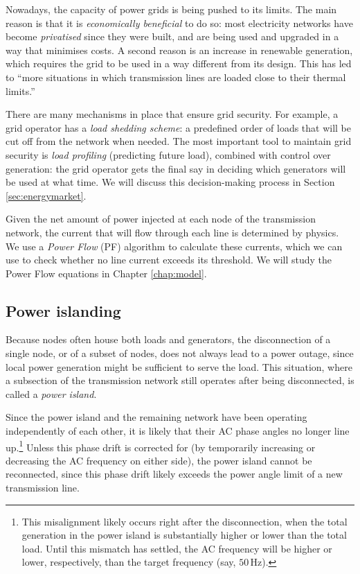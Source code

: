 \documentclass[main.tex]{subfiles}
\begin{document}
Nowadays, the capacity of power grids is being pushed to its limits. The main reason is that it is \emph{economically beneficial} to do so: most electricity networks have become \emph{privatised} since they were built, and are being used and upgraded in a way that minimises costs. A second reason is an increase in renewable generation, which requires the grid to be used in a way different from its design. This has led to ``more situations in which transmission lines are loaded close to their thermal limits.'' \citep{Ronellenfitsch2017}

There are many mechanisms in place that ensure grid security. For example, a grid operator has a \emph{load shedding scheme}: a predefined order of loads that will be cut off from the network when needed. The most important tool to maintain grid security is \emph{load profiling} (\ie predicting future load), combined with control over generation: the grid operator gets the final say in deciding which generators will be used at what time. We will discuss this decision-making process in Section \ref{sec:energymarket}.

Given the net amount of power injected at each node of the transmission network, the current that will flow through each line is determined by physics. We use a \emph{Power Flow} (PF) algorithm to calculate these currents, which we can use to check whether no line current exceeds its threshold. We will study the Power Flow equations in Chapter \ref{chap:model}.

\subsection{Power islanding}
Because nodes often house both loads and generators, the disconnection of a single node, or of a subset of nodes, does not always lead to a power outage, since local power generation might be sufficient to serve the load. This situation, where a subsection of the transmission network still operates after being disconnected, is called a \emph{power island}. 

Since the power island and the remaining network have been operating independently of each other, it is likely that their AC phase angles no longer line up.\footnote{This misalignment likely occurs right after the disconnection, when the total generation in the power island is substantially higher or lower than the total load. Until this mismatch has settled, the AC frequency will be higher or lower, respectively, than the target frequency (say, $50\,\si{\hertz}$).}
Unless this phase drift is corrected for (by temporarily increasing or decreasing the AC frequency on either side), the power island cannot be reconnected, since this phase drift likely exceeds the power angle limit of a new transmission line. 
%
\end{document}
